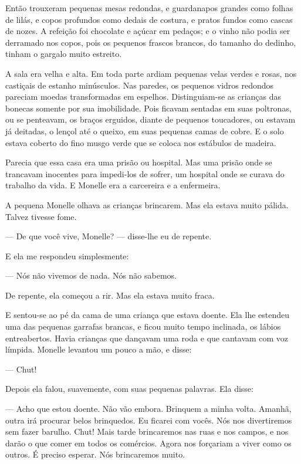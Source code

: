Então trouxeram pequenas mesas redondas, e guardanapos grandes
como folhas de lilás, e copos profundos como dedais de costura, e pratos
fundos como cascas de nozes. A refeição foi chocolate e açúcar em pedaços;
e o vinho não podia ser derramado nos copos, pois os pequenos frascos
brancos, do tamanho do dedinho, tinham o gargalo muito estreito.

A sala era velha e alta. Em toda parte ardiam pequenas velas verdes e
rosas, nos castiçais de estanho minúsculos. Nas paredes, os pequenos
vidros redondos pareciam moedas transformadas em espelhos. Distinguiam-se
as crianças das bonecas somente por sua imobilidade. Pois ficavam sentadas
em suas poltronas, ou se penteavam, os braços erguidos, diante de pequenos
toucadores, ou estavam já deitadas, o lençol até o queixo, em suas
pequenas camas de cobre. E o solo estava coberto do fino musgo verde que
se coloca nos estábulos de madeira.

Parecia que essa casa era uma prisão ou hospital. Mas uma prisão onde
se trancavam inocentes para impedi-los de sofrer, um hospital onde se
curava do trabalho da vida. E Monelle era a carcereira e a enfermeira.

A pequena Monelle olhava as crianças brincarem. Mas ela estava muito
pálida. Talvez tivesse fome.

--- De que você vive, Monelle? --- disse-lhe eu de repente.

E ela me respondeu simplesmente:

--- Nós não vivemos de nada. Nós não sabemos.

De repente, ela começou a rir. Mas ela estava muito fraca.

E sentou-se ao pé da cama de uma criança que estava doente. Ela lhe
estendeu uma das pequenas garrafas brancas, e ficou muito tempo inclinada,
os lábios entreabertos.
\pagebreak
Havia crianças que dançavam uma roda e que cantavam com voz límpida.
Monelle levantou um pouco a mão, e disse:

--- Chut!

Depois ela falou, suavemente, com suas pequenas palavras. Ela disse:

--- Acho que estou doente. Não vão embora. Brinquem a minha volta.
Amanhã, outra irá procurar belos brinquedos. Eu ficarei com vocês. Nós nos
divertiremos sem fazer barulho. Chut! Mais tarde brincaremos nas ruas e
nos campos, e nos darão o que comer em todos os comércios. Agora nos
forçariam a viver como os outros. É preciso esperar. Nós brincaremos muito.

